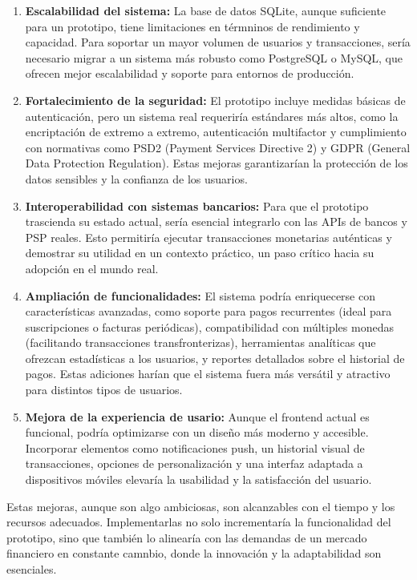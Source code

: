 \begin{enumerate}
    \item \textbf{Escalabilidad del sistema:} La base de datos SQLite, aunque suficiente para un prototipo, tiene limitaciones en térmninos de rendimiento y capacidad. Para soportar un mayor volumen de usuarios y transacciones, sería necesario migrar a un sistema más robusto como PostgreSQL o MySQL, que ofrecen mejor escalabilidad y soporte para entornos de producción.
    \item \textbf{Fortalecimiento de la seguridad:} El prototipo incluye medidas básicas de autenticación, pero un sistema real requeriría estándares más altos, como la encriptación de extremo a extremo, autenticación multifactor y cumplimiento con normativas como PSD2 (Payment Services Directive 2) y GDPR (General Data Protection Regulation). Estas mejoras garantizarían la protección de los datos sensibles y la confianza de los usuarios.
    \item \textbf{Interoperabilidad con sistemas bancarios:} Para que el prototipo trascienda su estado actual, sería esencial integrarlo con las APIs de bancos y PSP reales. Esto permitiría ejecutar transacciones monetarias auténticas y demostrar su utilidad en un contexto práctico, un paso crítico hacia su adopción en el mundo real.
    \item \textbf{Ampliación de funcionalidades:} El sistema podría enriquecerse con características avanzadas, como soporte para pagos recurrentes (ideal para suscripciones o facturas periódicas), compatibilidad con múltiples monedas (facilitando transacciones transfronterizas), herramientas analíticas que ofrezcan estadísticas a los usuarios, y reportes detallados sobre el historial de pagos. Estas adiciones harían que el sistema fuera más versátil y atractivo para distintos tipos de usuarios.
    \item \textbf{Mejora de la experiencia de usario:} Aunque el frontend actual es funcional, podría optimizarse con un diseño más moderno y accesible. Incorporar elementos como notificaciones push, un historial visual de transacciones, opciones de personalización y una interfaz adaptada a dispositivos móviles elevaría la usabilidad y la satisfacción del usuario.
\end{enumerate}

Estas mejoras, aunque son algo ambiciosas, son alcanzables con el tiempo y los recursos adecuados. Implementarlas no solo incrementaría la funcionalidad del prototipo, sino que también lo alinearía con las demandas de un mercado financiero en constante camnbio, donde la innovación y la adaptabilidad son esenciales.

